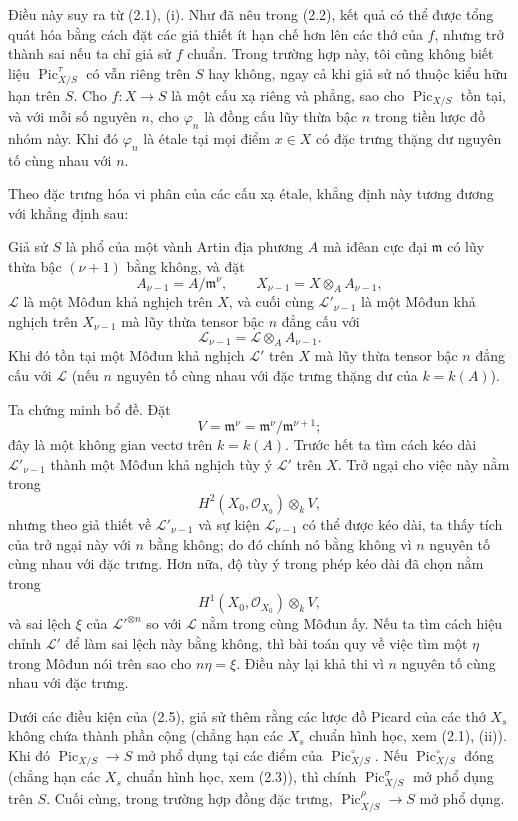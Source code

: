 Điều này suy ra từ (2.1), (i). Như đã nêu trong (2.2), kết quả có thể được tổng
quát hóa bằng cách đặt các giả thiết ít hạn chế hơn lên các thớ của $f$, nhưng
trở thành sai nếu ta chỉ giả sử $f$ chuẩn. Trong trường hợp này, tôi cũng không
biết liệu $\operatorname{Pic}_{X/S}^\tau$ có vẫn riêng trên $S$ hay không,
ngay cả khi giả sử nó thuộc kiểu hữu hạn trên $S$.
 Cho $f:X\longrightarrow S$ là một cấu xạ riêng và
phẳng, sao cho $\operatorname{Pic}_{X/S}$ tồn tại, và với mỗi số nguyên $n$,
cho $\varphi_n$ là đồng cấu lũy thừa bậc $n$ trong tiền lược đồ nhóm này. Khi
đó $\varphi_n$ là étale tại mọi điểm
$x\in X$ có đặc trưng
thặng dư nguyên tố cùng nhau với $n$.

Theo đặc trưng hóa vi phân của các cấu xạ étale, khẳng định này tương đương với
khẳng định sau:

 Giả sử $S$ là phổ của một vành Artin địa phương $A$ mà
iđêan cực đại $\mathfrak m$ có lũy thừa bậc $(\nu+1)$ bằng không, và đặt
\[
A_{\nu-1}=A/\mathfrak m^\nu,
\qquad X_{\nu-1}=X\otimes_A A_{\nu-1},
\]
$\mathcal L$ là một Môđun khả nghịch trên $X$, và cuối cùng
$\mathcal L'_{\nu-1}$ là một Môđun khả nghịch trên $X_{\nu-1}$ mà lũy thừa
tensor bậc $n$ đẳng cấu với
\[
\mathcal L_{\nu-1}=\mathcal L\otimes_A A_{\nu-1}.
\]
Khi đó tồn tại một Môđun khả nghịch $\mathcal L'$ trên $X$ mà lũy thừa tensor
bậc $n$ đẳng cấu với $\mathcal L$ (nếu $n$ nguyên tố cùng nhau với đặc trưng
thặng dư của $k=k(A)$).

Ta chứng minh bổ đề. Đặt
\[
V=\mathfrak m^\nu=\mathfrak m^\nu/\mathfrak m^{\nu+1} ;
\]
đây là một không gian vectơ trên $k=k(A)$. Trước hết ta tìm cách kéo dài
$\mathcal L'_{\nu-1}$ thành một Môđun khả nghịch tùy ý $\mathcal L'$ trên
$X$. Trở ngại cho việc này nằm trong
\[
H^2(X_0,\mathcal O_{X_0})\otimes_k V,
\]
nhưng theo giả thiết về $\mathcal L'_{\nu-1}$ và sự kiện
$\mathcal L_{\nu-1}$ có thể được kéo dài, ta thấy tích của trở ngại này với
$n$ bằng không; do đó chính nó bằng không vì $n$ nguyên tố cùng nhau với đặc
trưng. Hơn nữa, độ tùy ý trong phép kéo dài đã chọn nằm trong
\[
H^1(X_0,\mathcal O_{X_0})\otimes_k V,
\]
và sai lệch $\xi$ của $\mathcal L'^{\otimes n}$ so với $\mathcal L$ nằm trong
cùng Môđun ấy. Nếu ta tìm cách hiệu chỉnh $\mathcal L'$ để làm sai lệch này
bằng không, thì bài toán quy về việc tìm một $\eta$ trong Môđun nói trên sao
cho $n\eta=\xi$. Điều này lại khả thi vì $n$ nguyên tố cùng nhau với đặc
trưng.

 Dưới các điều kiện của (2.5), giả sử thêm rằng các lược đồ
Picard của các thớ $X_s$ không chứa thành phần cộng (chẳng hạn các $X_s$ chuẩn
hình học, xem (2.1), (ii)). Khi đó
$\operatorname{Pic}_{X/S}\longrightarrow S$ mở phổ dụng tại các điểm của
$\operatorname{Pic}_{X/S}^\circ$. Nếu $\operatorname{Pic}_{X/S}^\circ$ đóng
(chẳng hạn các $X_s$ chuẩn hình học, xem (2.3)), thì chính
$\operatorname{Pic}_{X/S}^\sigma$ mở phổ dụng trên $S$. Cuối cùng, trong
trường hợp đồng đặc trưng, $\operatorname{Pic}_{X/S}^\rho\longrightarrow S$
mở phổ dụng.

